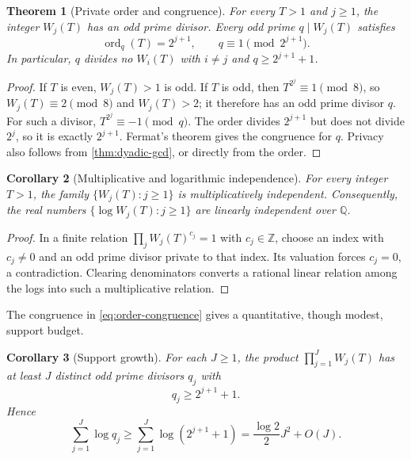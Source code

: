 \documentclass[11pt]{article}
\newtheorem{theorem}{Theorem}[section]
\newtheorem{corollary}[theorem]{Corollary}
\theoremstyle{definition}
\newcommand{\Q}{\mathbb Q}
\newcommand{\Z}{\mathbb Z}
\newcommand{\ord}{\operatorname{ord}}
\begin{document}
\begin{theorem}[Private order and congruence]\label{thm:private-order}
For every $T>1$ and $j\ge1$, the integer $W_j(T)$ has an odd prime divisor.  Every odd
prime $q\mid W_j(T)$ satisfies
\begin{equation}\label{eq:order-congruence}
 \ord_q(T)=2^{j+1},
 \qquad q\equiv1\pmod{2^{j+1}}.
\end{equation}
In particular, $q$ divides no $W_i(T)$ with $i\ne j$ and $q\ge2^{j+1}+1$.
\end{theorem}

\begin{proof}
If $T$ is even, $W_j(T)>1$ is odd.  If $T$ is odd, then
$T^{2^j}\equiv1\pmod8$, so $W_j(T)\equiv2\pmod8$ and $W_j(T)>2$; it therefore has an odd
prime divisor $q$.  For such a divisor,
$T^{2^j}\equiv-1\pmod q$.  The order divides $2^{j+1}$ but does not divide $2^j$, so it is
exactly $2^{j+1}$.  Fermat's theorem gives the congruence for $q$.  Privacy also follows
from \cref{thm:dyadic-gcd}, or directly from the order.
\end{proof}

\begin{corollary}[Multiplicative and logarithmic independence]
\label{cor:W-independence}
For every integer $T>1$, the family $\{W_j(T):j\ge1\}$ is multiplicatively independent.
Consequently, the real numbers $\{\log W_j(T):j\ge1\}$ are linearly independent over
$\Q$.
\end{corollary}

\begin{proof}
In a finite relation $\prod_jW_j(T)^{c_j}=1$ with $c_j\in\Z$, choose an index with
$c_j\ne0$ and an odd prime divisor private to that index.  Its valuation forces $c_j=0$,
a contradiction.  Clearing denominators converts a rational linear relation among the
logs into such a multiplicative relation.
\end{proof}

The congruence in \eqref{eq:order-congruence} gives a quantitative, though modest, support
budget.

\begin{corollary}[Support growth]\label{cor:support-growth}
For each $J\ge1$, the product $\prod_{j=1}^JW_j(T)$ has at least $J$ distinct odd prime
divisors $q_j$ with
\begin{equation}\label{eq:qj-lower}
 q_j\ge2^{j+1}+1.
\end{equation}
Hence
\begin{equation}\label{eq:prime-log-budget}
 \sum_{j=1}^J\log q_j
 \ge \sum_{j=1}^J\log(2^{j+1}+1)
 =\frac{\log2}{2}J^2+O(J).
\end{equation}
\end{corollary}
\end{document}
